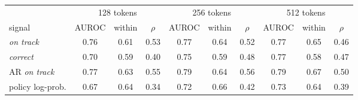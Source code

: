 \begin{tabular}{@{}lccccccccc@{}}
\toprule
 & \multicolumn{3}{c}{128 tokens} & \multicolumn{3}{c}{256 tokens} & \multicolumn{3}{c}{512 tokens} \\ \cmidrule(lr){2-4}\cmidrule(lr){5-7}\cmidrule(lr){8-10}
signal & AUROC & within & $\rho$ & AUROC & within & $\rho$ & AUROC & within & $\rho$ \\ \midrule
\kev{} \emph{on track} & 0.76 & 0.61 & 0.53 & 0.77 & 0.64 & 0.52 & 0.77 & 0.65 & 0.46 \\
\kev{} \emph{correct} & 0.70 & 0.59 & 0.40 & 0.75 & 0.59 & 0.48 & 0.77 & 0.58 & 0.47 \\
AR \emph{on track} & 0.77 & 0.63 & 0.55 & 0.79 & 0.64 & 0.56 & 0.79 & 0.67 & 0.50 \\
policy log-prob. & 0.67 & 0.64 & 0.34 & 0.72 & 0.66 & 0.42 & 0.73 & 0.64 & 0.39 \\
\bottomrule
\end{tabular}
